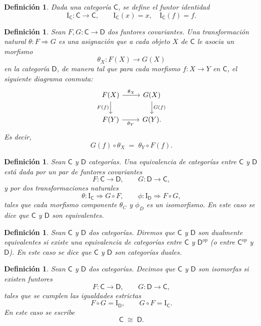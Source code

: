 \documentclass[12pt]{book}
\newtheorem{definition}[theorem]{Definición}
\begin{document}
\begin{definition}
Dada una categoría \( \mathsf{C} \), se define el \emph{funtor identidad}
\[
\mathrm{I}_{\mathsf{C}}\colon \mathsf{C}\to\mathsf{C},
\qquad
\mathrm{I}_{\mathsf{C}}(x)=x,\quad \mathrm{I}_{\mathsf{C}}(f)=f.
\]
\end{definition}


\begin{definition}\label{def:transf-nat}
Sean $F,G \colon \mathsf{C} \to \mathsf{D}$ dos funtores covariantes. 
Una \emph{transformación natural} $\theta \colon F \Rightarrow G$
es una asignación que a cada objeto $X$ de $\mathsf{C}$ le
asocia un morfismo
\[
\theta_X \colon F(X) \longrightarrow G(X)
\]
en la categoría $\mathsf{D}$, de manera tal que para cada
morfismo $f \colon X \to Y$ en $\mathsf{C}$, el siguiente diagrama conmuta:
\[
\begin{tikzcd}
F(X) \arrow[r, "\theta_X"] \arrow[d, "F(f)"'] &
G(X) \arrow[d, "G(f)"] \\
F(Y) \arrow[r, "\theta_Y"'] &
G(Y).
\end{tikzcd}
\]
Es decir, 
\[
G(f)\circ \theta_X \;=\; \theta_Y \circ F(f).
\]
\end{definition}


\begin{definition}
Sean \( \mathsf{C} \) y \( \mathsf{D} \) categorías.
Una \emph{equivalencia de categorías} entre \( \mathsf{C} \) y \( \mathsf{D} \)
está dada por un par de funtores covariantes
\[
F\colon\mathsf{C}\to\mathsf{D},
\qquad
G\colon\mathsf{D}\to\mathsf{C},
\]
y por dos transformaciones naturales
\[
\theta\colon \mathrm{I}_{\mathsf{C}}\Rightarrow G\circ F,
\qquad
\phi\colon \mathrm{I}_{\mathsf{D}}\Rightarrow F\circ G,
\]
tales que cada morfismo componente \( \theta_{C} \) y \( \phi_{D} \) es un isomorfismo.
En este caso se dice que \( \mathsf{C} \) y \( \mathsf{D} \) son \emph{equivalentes}.
\end{definition}

\begin{definition}\label{def:equivalencia-dual}
Sean \( \mathsf{C} \) y \( \mathsf{D} \) dos categorías.
Diremos que \( \mathsf{C} \) y \( \mathsf{D} \) son \emph{dualmente equivalentes}
si existe una equivalencia de categorías entre \( \mathsf{C} \) y \( \mathsf{D}^{op} \) (o entre \( \mathsf{C}^{op} \) y \( \mathsf{D} \)). En este caso se dice que \( \mathsf{C} \) y \( \mathsf{D} \) son categorías \emph{duales}.
\end{definition}

\begin{definition}\label{def:isomorfismo-categorias}
Sean \( \mathsf{C} \) y \( \mathsf{D} \) dos categorías.
Decimos que \( \mathsf{C} \) y \( \mathsf{D} \) son \emph{isomorfas}
si existen funtores
\[
F\colon \mathsf{C} \longrightarrow \mathsf{D},
\qquad
G\colon \mathsf{D} \longrightarrow \mathsf{C},
\]
tales que se cumplen las igualdades estrictas
\[
F\circ G = \mathrm{I}_{\mathsf{D}},
\qquad
G\circ F = \mathrm{I}_{\mathsf{C}}.
\]
En este caso se escribe
\[
\mathsf{C}\;\cong\;\mathsf{D}.
\]
\end{definition}
\end{document}
